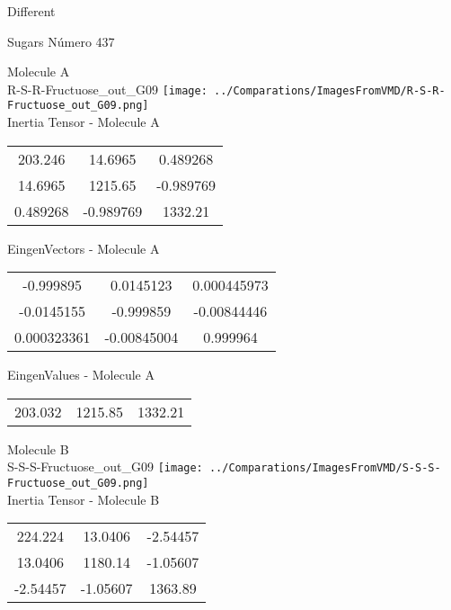 \begin{center}
\vtab
\vtab
\textcolor{NavyBlue}{\Large Different}
\end{center}

 \newpage

\vtab[-2cm]
\begin{center}
{\large Sugars \tab Número 437}
\end{center}
\begin{multicols}{2}
\begin{center}

Molecule A \\ 
R-S-R-Fructuose\_out\_G09
\texttt{[image: ../Comparations/ImagesFromVMD/R-S-R-Fructuose\_out\_G09.png]}
\\
Inertia Tensor - Molecule A \\
\vtab

\begin{tabular}{|c c c|}
203.246	 & 	14.6965	 & 	0.489268	 \\
14.6965	 & 	1215.65	 & 	-0.989769	 \\
0.489268	 & 	-0.989769	 & 	1332.21
\end{tabular}

\vtab
 EingenVectors - Molecule A     \\
\vtab
\begin{tabular}{|c c c|}
-0.999895	 & 	0.0145123	 & 	0.000445973	 \\
-0.0145155	 & 	-0.999859	 & 	-0.00844446	 \\
0.000323361	 & 	-0.00845004	 & 	0.999964
\end{tabular}

\vtab
 EingenValues - Molecule A     \\
\vtab
\begin{tabular}{|c c c|}
203.032	 & 	1215.85	 & 	1332.21	 \\
\end{tabular}
\columnbreak

Molecule B \\ 
S-S-S-Fructuose\_out\_G09
\texttt{[image: ../Comparations/ImagesFromVMD/S-S-S-Fructuose\_out\_G09.png]}
\\
Inertia Tensor - Molecule B \\
\vtab

\begin{tabular}{|c c c|}
224.224	 & 	13.0406	 & 	-2.54457	 \\
13.0406	 & 	1180.14	 & 	-1.05607	 \\
-2.54457	 & 	-1.05607	 & 	1363.89
\end{tabular}


\end{center}
\end{multicols}
